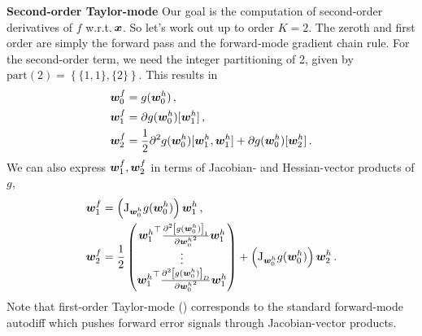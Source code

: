 \textbf{Second-order Taylor-mode} Our goal is the computation of second-order derivatives of $f$ w.r.t.\,${\bm{x}}$.
So let's work out  up to order $K=2$.
The zeroth and first order are simply the forward pass and the forward-mode gradient chain rule.
For the second-order term, we need the integer partitioning of 2, given by $\mathrm{part}(2) = \left\{ \{1, 1\}, \{2\} \right\}$.
This results in
\begin{subequations}\label{eq:taylor-mode-second-order}
  \begin{align}
    {\bm{w}}_0^f
    &=
      g({\bm{w}}_0^h)\,,
    \\
    {\bm{w}}_1^f
    &=
      \partial g({\bm{w}}_0^h)[{\bm{w}}_1^h]\,,
    \\
    {\bm{w}}_2^f
    &=
      \frac{1}{2}
      \partial^2 g({\bm{w}}_0^h)[{\bm{w}}_1^h, {\bm{w}}_1^h]
      +
      \partial g({\bm{w}}_0^h)[{\bm{w}}_2^h]\,.
  \end{align}
\end{subequations}
We can also express ${\bm{w}}_1^f, {\bm{w}}_2^f$ in terms of Jacobian- and Hessian-vector products of $g$,
\begin{subequations}\label{eq:taylor-mode-second-order-jac-hess}
  \begin{align}
    \label{eq:taylor-mode-second-order-jac}
    {\bm{w}}_1^f
    &=
      \left(
      \mathrm{J}_{{\bm{w}}_0^h} g({\bm{w}}_0^h)
      \right) {\bm{w}}_1^h\,,
    \\
    {\bm{w}}_2^f
    &=
      \frac{1}{2}
      \begin{pmatrix}
        {{\bm{w}}_1^h}^{\top}
        \frac{
        \partial^2 \left[ g({\bm{w}}_0^h) \right]_1
        }{
        \partial{{\bm{w}}_0^h}^2
        }
        {\bm{w}}_1^h
        \\
        \vdots
        \\
        {{\bm{w}}_1^h}^{\top}
        \frac{
        \partial^2 \left[ g({\bm{w}}_0^h) \right]_D
        }{
        \partial{{\bm{w}}_0^h}^2
        }
        {\bm{w}}_1^h
      \end{pmatrix}
      +
      \left(
      \mathrm{J}_{{\bm{w}}_0^h} g({\bm{w}}_0^h)
      \right) {\bm{w}}_2^h\,.
  \end{align}
\end{subequations}
Note that first-order Taylor-mode () corresponds to the standard forward-mode autodiff which pushes forward error signals through Jacobian-vector products.


